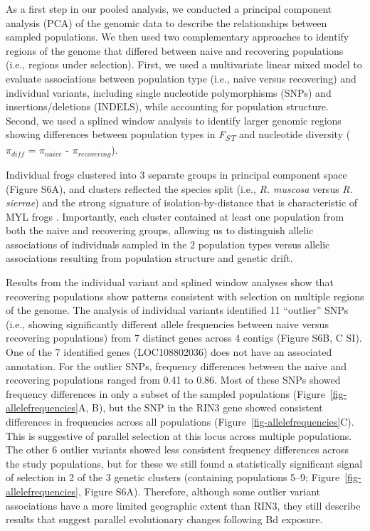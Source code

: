 \documentclass[9pt,twocolumn,twoside,lineno]{pnas-new}
\begin{document}
As a first step in our pooled analysis, we conducted a principal
component analysis (PCA) of the genomic data to describe the
relationships between sampled populations. We then used two
complementary approaches to identify regions of the genome that differed
between naive and recovering populations (i.e., regions under
selection). First, we used a multivariate linear mixed model to evaluate
associations between population type (i.e., naive versus recovering) and
individual variants, including single nucleotide polymorphisms (SNPs)
and insertions/deletions (INDELS), while accounting for population
structure. Second, we used a splined window analysis to identify larger
genomic regions showing differences between population types in
\emph{F\textsubscript{ST}} and nucleotide diversity (\(\pi_{diff}\) =
\(\pi_{naive}\) - \(\pi_{recovering}\)).

Individual frogs clustered into 3 separate groups in principal component
space (Figure S6A), and clusters reflected
the species split (i.e., \emph{R. muscosa} versus \emph{R. sierrae}) and
the strong signature of isolation-by-distance that is characteristic of
MYL frogs \citep{rothstein2020, poorten2017, byrne2023}. Importantly,
each cluster contained at least one population from both the naive and
recovering groups, allowing us to distinguish allelic associations of
individuals sampled in the 2 population types versus allelic
associations resulting from population structure and genetic drift.

Results from the individual variant and splined window analyses show
that recovering populations show patterns consistent with selection on
multiple regions of the genome. The analysis of individual variants
identified 11 ``outlier'' SNPs (i.e., showing significantly different
allele frequencies between naive versus recovering populations) from 7
distinct genes across 4 contigs (Figure S6B, C
SI). One of the 7 identified genes (LOC108802036) does not have an
associated annotation. For the outlier SNPs, frequency differences
between the naive and recovering populations ranged from 0.41 to 0.86.
Most of these SNPs showed frequency differences in only a subset of the
sampled populations (Figure~\ref{fig-allelefrequencies}A, B), but the
SNP in the RIN3 gene showed consistent differences in frequencies across
all populations (Figure~\ref{fig-allelefrequencies}C). This is
suggestive of parallel selection at this locus across multiple
populations. The other 6 outlier variants showed less consistent
frequency differences across the study populations, but for these we
still found a statistically significant signal of selection in 2 of the
3 genetic clusters (containing populations 5--9;
Figure~\ref{fig-allelefrequencies}, Figure S6A). Therefore, although some outlier variant associations have a more
limited geographic extent than RIN3, they still describe results that
suggest parallel evolutionary changes following Bd exposure.
\end{document}
